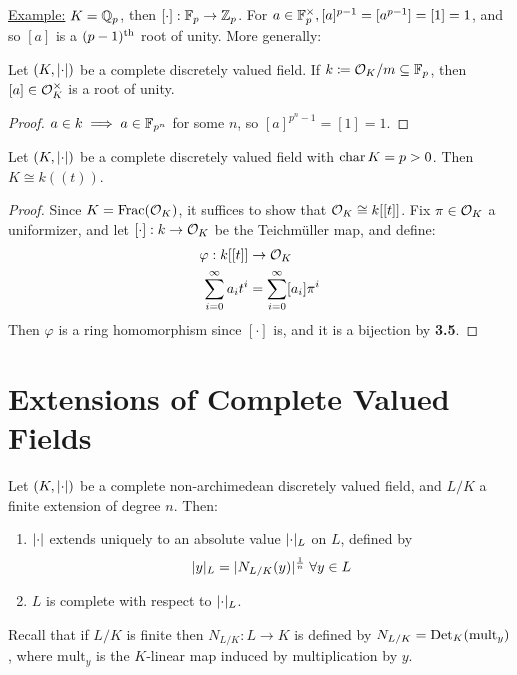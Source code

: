 \documentclass[10pt,a4paper]{article}
\begin{document}
\underline{Example:} $K = \mathbb{Q}_p$, then $[\cdot]:\mathbb{F}_p \to \mathbb{Z}_p$. For $a \in \mathbb{F}_p^\times, [a]^{p-1} = [a^{p-1}] = [1] = 1$, and so $[a]$ is a $(p-1)\textsuperscript{th}$ root of unity. More generally:
\begin{lemma}
  Let $(K, \lvert\cdot\rvert)$ be a complete discretely valued field. If $k \coloneqq \mathcal{O}_K/m \subseteq \mathbb{F}_p$, then $[a] \in \mathcal{O}_K^\times$ is a root of unity.
\end{lemma}
\begin{proof}
  $a \in k \implies a \in \mathbb{F}_{p^n}$ for some $n$, so $[a]^{p^n-1} = [1] = 1$.
\end{proof}
\begin{theorem}
  Let $(K, \lvert\cdot\rvert)$ be a complete discretely valued field with $\operatorname{char} K = p > 0$. Then $K \cong k((t))$.
\end{theorem}
\begin{proof}
  Since $K = \operatorname{Frac}(\mathcal{O}_K)$, it suffices to show that $\mathcal{O}_K \cong k[[t]]$. Fix $\pi \in \mathcal{O}_K$ a uniformizer, and let $[\cdot]:k \to \mathcal{O}_K$ be the Teichm\"uller map, and define:
  \begin{align*}
    \varphi: k[[t]] &\to \mathcal{O}_K\\
    \sum_{i=0}^\infty a_i t^i &= \sum_{i=0}^\infty [a_i]\pi^i
  \end{align*}
  Then $\varphi$ is a ring homomorphism since $[\cdot]$ is, and it is a bijection by \textbf{3.5}.
\end{proof}

\section{Extensions of Complete Valued Fields}
\begin{theorem}
  Let $(K, \lvert\cdot\rvert)$ be a complete non-archimedean discretely valued field, and $L/K$ a finite extension of degree $n$. Then:
  \begin{enumerate}
    \item $\lvert\cdot\rvert$ extends uniquely to an absolute value $\lvert\cdot\rvert_L$ on $L$, defined by
    \[\abs{y}_L = \abs{N_{L/K}(y)}^{\frac{1}{n}}\forall y \in L\]
    \item $L$ is complete with respect to $\lvert\cdot\rvert_L$.
  \end{enumerate}
\end{theorem}

Recall that if $L/K$ is finite then $N_{L/K}:L \to K$ is defined by $N_{L/K} = \operatorname{Det}_K(\text{mult}_y)$, where $\text{mult}_y$ is the $K$-linear map induced by multiplication by $y$.
\end{document}
